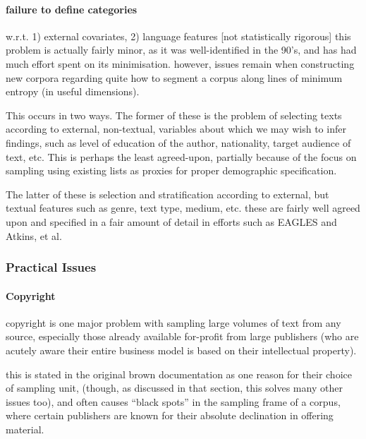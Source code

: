 





\paragraph{ failure to define categories }
w.r.t. 1) external covariates, 2) language features [not statistically rigorous]
this problem is actually fairly minor, as it was well-identified in the 90's, and has had much effort spent on its minimisation.  however, issues remain when constructing new corpora regarding quite how to segment a corpus along lines of minimum entropy (in useful dimensions).

This occurs in two ways. The former of these is the problem of selecting texts according to external, non-textual, variables about which we may wish to infer findings, such as level of education of the author, nationality, target audience of text, etc. This is perhaps the least agreed-upon, partially because of the focus on sampling using existing lists as proxies for proper demographic specification.

The latter of these is selection and stratification according to external, but textual features such as genre, text type, medium, etc. these are fairly well agreed upon and specified in a fair amount of detail in efforts such as EAGLES and Atkins, et al.  








\subsubsection{Practical Issues}

\paragraph{Copyright}
copyright is one major problem with sampling large volumes of text from any source, especially those already available for-profit from large publishers (who are acutely aware their entire business model is based on their intellectual property).

this is stated in the original brown documentation as one reason for their choice of sampling unit, (though, as discussed in that section, this solves many other issues too), and often causes ``black spots'' in the sampling frame of a corpus, where certain publishers are known for their absolute declination in offering material.

